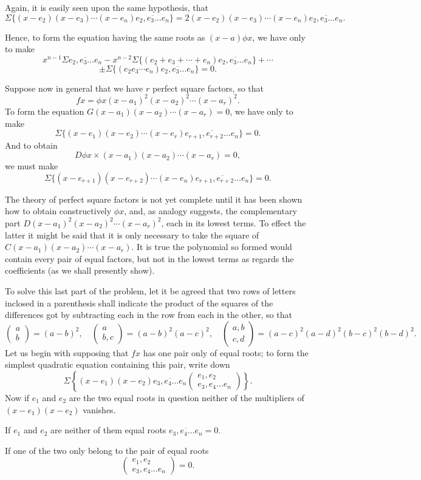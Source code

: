 \documentclass[11pt]{article}
\newcommand{\sourcepage}[1]{\marginpar{\scriptsize p.~#1}}
\newcommand{\rowparen}[2]{\left(\begin{matrix}#1\\#2\end{matrix}\right)}
\newcommand{\pgram}[1]{\overline{#1}}
\begin{document}
Again, it is easily seen upon the same hypothesis, that
\[
\Sigma\{(x-e_2)(x-e_3)\cdots(x-e_n)\pgram{e_2,e_3\ldots e_n}\}
=2(x-e_2)(x-e_3)\cdots(x-e_n)\pgram{e_2,e_3\ldots e_n}.
\]

\sourcepage{72}
Hence, to form the equation having the same roots as $(x-a)\phi x$, we have only to make
\[
 x^{n-1}\Sigma\pgram{e_2,e_3\ldots e_n}
 -x^{n-2}\Sigma\{(e_2+e_3+\cdots+e_n)\pgram{e_2,e_3\ldots e_n}\}+
 \cdots
\]
\[
 \pm\Sigma\{(e_2e_3\cdots e_n)\pgram{e_2,e_3\ldots e_n}\}=0.
\]

Suppose now in general that we have $r$ perfect square factors, so that
\[
 fx=\phi x(x-a_1)^2(x-a_2)^2\cdots(x-a_r)^2.
\]
To form the equation $G(x-a_1)(x-a_2)\cdots(x-a_r)=0$, we have only to make
\[
 \Sigma\{(x-e_1)(x-e_2)\cdots(x-e_r)\pgram{e_{r+1},e_{r+2}\ldots e_n}\}=0.
\]
And to obtain
\[
 D\phi x\times(x-a_1)(x-a_2)\cdots(x-a_r)=0,
\]
we must make
\[
 \Sigma\{(x-e_{r+1})(x-e_{r+2})\cdots(x-e_n)
 \pgram{e_{r+1},e_{r+2}\ldots e_n}\}=0.
\]

The theory of perfect square factors is not yet complete until it has been shown how to obtain constructively $\phi x$, and, as analogy suggests, the complementary part $D(x-a_1)^2(x-a_2)^2\cdots(x-a_r)^2$, each in its lowest terms. To effect the latter it might be said that it is only necessary to take the square of $C(x-a_1)(x-a_2)\cdots(x-a_r)$. It is true the polynomial so formed would contain every pair of equal factors, but not in the lowest terms as regards the coefficients (as we shall presently show).

To solve this last part of the problem, let it be agreed that two rows of letters inclosed in a parenthesis shall indicate the product of the squares of the differences got by subtracting each in the row from each in the other, so that
\[
 \rowparen{a}{b}=(a-b)^2,
 \quad
 \rowparen{a}{b,c}=(a-b)^2(a-c)^2,
 \quad
 \rowparen{a,b}{c,d}=(a-c)^2(a-d)^2(b-c)^2(b-d)^2.
\]
Let us begin with supposing that $fx$ has one pair only of equal roots; to form the simplest quadratic equation containing this pair, write down
\[
 \Sigma\left\{(x-e_1)(x-e_2)\pgram{e_3,e_4\ldots e_n}
 \rowparen{e_1,e_2}{e_3,e_4\ldots e_n}\right\}.
\]
Now if $e_1$ and $e_2$ are the two equal roots in question neither of the multipliers of $(x-e_1)(x-e_2)$ vanishes.

If $e_1$ and $e_2$ are neither of them equal roots $\pgram{e_3,e_4\ldots e_n}=0$.

If one of the two only belong to the pair of equal roots
\[
 \rowparen{e_1,e_2}{e_3,e_4\ldots e_n}=0.
\]
\end{document}
